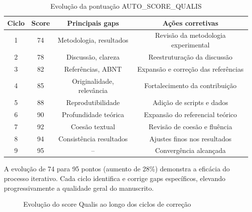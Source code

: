 \begin{table}[htb]
\centering
\caption{Evolução da pontuação AUTO\_SCORE\_QUALIS}
\label{tab:evolucao-score}
\begin{tabular}{cccc}
\toprule
\textbf{Ciclo} & \textbf{Score} & \textbf{Principais gaps} & \textbf{Ações corretivas} \\
\midrule
1 & 74 & Metodologia, resultados & Revisão da metodologia experimental \\
2 & 78 & Discussão, clareza & Reestruturação da discussão \\
3 & 82 & Referências, ABNT & Expansão e correção das referências \\
4 & 85 & Originalidade, relevância & Fortalecimento da contribuição \\
5 & 88 & Reprodutibilidade & Adição de scripts e dados \\
6 & 90 & Profundidade teórica & Expansão do referencial teórico \\
7 & 92 & Coesão textual & Revisão de coesão e fluência \\
8 & 94 & Consistência resultados & Ajustes finos nos resultados \\
9 & 95 & -- & Convergência alcançada \\
\bottomrule
\end{tabular}
\end{table}

A evolução de 74 para 95 pontos (aumento de 28\%) demonstra a eficácia do
processo iterativo. Cada ciclo identifica e corrige gaps específicos,
elevando progressivamente a qualidade geral do manuscrito.

\begin{figure}[htb]
\centering
{}
\caption{Evolução do score Qualis ao longo dos ciclos de correção}
\label{fig:evolucao-score-qualis}
\end{figure}

